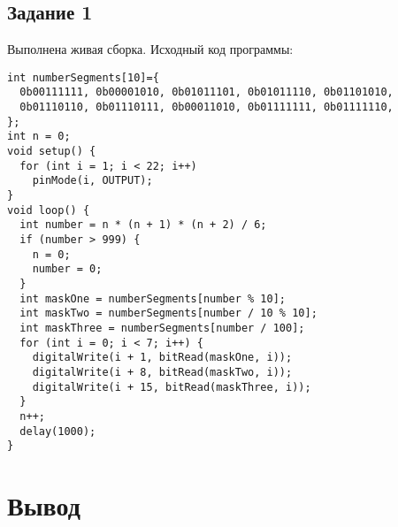 \documentclass[a4paper,14pt]{extarticle}
\begin{document}
  \subsection*{\hspace{12.5mm}Задание 1}
  Выполнена живая сборка. Исходный код программы:

  \begingroup
    \fontsize{14pt}{10pt}\selectfont
    \linespread{1}
    \begin{verbatim}
int numberSegments[10]={
  0b00111111, 0b00001010, 0b01011101, 0b01011110, 0b01101010,
  0b01110110, 0b01110111, 0b00011010, 0b01111111, 0b01111110,
};
int n = 0;
void setup() {
  for (int i = 1; i < 22; i++)
    pinMode(i, OUTPUT);
}
void loop() {
  int number = n * (n + 1) * (n + 2) / 6;
  if (number > 999) {
    n = 0;
    number = 0;
  }
  int maskOne = numberSegments[number % 10];
  int maskTwo = numberSegments[number / 10 % 10];
  int maskThree = numberSegments[number / 100];
  for (int i = 0; i < 7; i++) {
    digitalWrite(i + 1, bitRead(maskOne, i));
    digitalWrite(i + 8, bitRead(maskTwo, i));
    digitalWrite(i + 15, bitRead(maskThree, i));
  }
  n++;
  delay(1000);
}
    \end{verbatim}
  \endgroup

  \section*{\hspace{12.5mm}Вывод}
\end{document}
